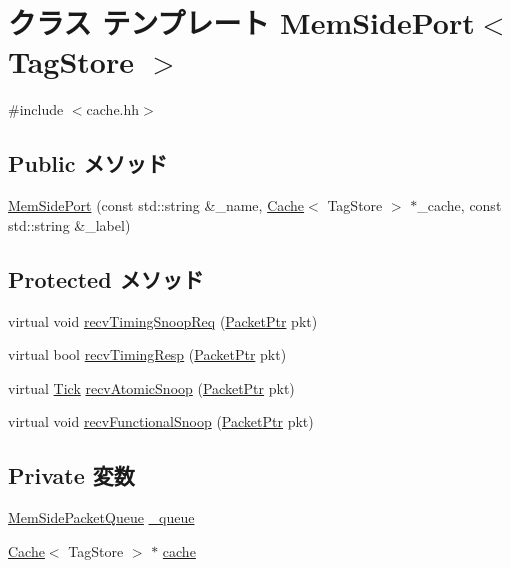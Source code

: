 \hypertarget{classCache_1_1MemSidePort}{
\section{クラス テンプレート MemSidePort$<$ TagStore $>$}
\label{classCache_1_1MemSidePort}
}


{\ttfamily \#include $<$cache.hh$>$}\subsection*{Public メソッド}
\begin{DoxyCompactItemize}
\item 
\hyperlink{classCache_1_1MemSidePort_ae5fb366af0a2e94b8c3ecb4e8594a6eb}{MemSidePort} (const std::string \&\_\-name, \hyperlink{classCache}{Cache}$<$ TagStore $>$ $\ast$\_\-cache, const std::string \&\_\-label)
\end{DoxyCompactItemize}
\subsection*{Protected メソッド}
\begin{DoxyCompactItemize}
\item 
virtual void \hyperlink{classCache_1_1MemSidePort_aff3031c56fc4947a19695c868bb8233e}{recvTimingSnoopReq} (\hyperlink{classPacket}{PacketPtr} pkt)
\item 
virtual bool \hyperlink{classCache_1_1MemSidePort_a482dba5588f4bee43e498875a61e5e0b}{recvTimingResp} (\hyperlink{classPacket}{PacketPtr} pkt)
\item 
virtual \hyperlink{base_2types_8hh_a5c8ed81b7d238c9083e1037ba6d61643}{Tick} \hyperlink{classCache_1_1MemSidePort_a886d584c81ee4e398ff8069907f6e1a5}{recvAtomicSnoop} (\hyperlink{classPacket}{PacketPtr} pkt)
\item 
virtual void \hyperlink{classCache_1_1MemSidePort_a284dfb90c168233c9d416bc07de8fefe}{recvFunctionalSnoop} (\hyperlink{classPacket}{PacketPtr} pkt)
\end{DoxyCompactItemize}
\subsection*{Private 変数}
\begin{DoxyCompactItemize}
\item 
\hyperlink{classCache_1_1MemSidePacketQueue}{MemSidePacketQueue} \hyperlink{classCache_1_1MemSidePort_a3a20f77334fdfcb8ec2e8cccd925f95f}{\_\-queue}
\item 
\hyperlink{classCache}{Cache}$<$ TagStore $>$ $\ast$ \hyperlink{classCache_1_1MemSidePort_ae1a869e306f5bc5028f706229d68aba1}{cache}
\end{DoxyCompactItemize}



